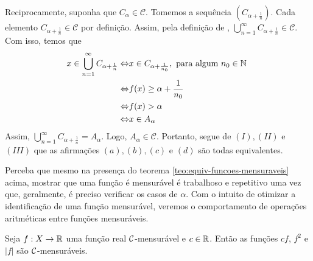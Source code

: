 \begin{prova}
Reciprocamente, suponha que $C_\alpha \in \mathcal{C}$. Tomemos a sequência $\left(C_{\alpha + \frac{1}{n}}\right)$.
Cada elemento $C_{\alpha +\frac{1}{n}} \in \mathcal{C}$ por definição.
Assim, pela definição de \sigal, 
$\displaystyle \bigcup_{n = 1}^\infty C_{\alpha +\frac{1}{n}} \in \mathcal{C}$. Com isso, temos que
\begin{align*}
    x \in \displaystyle \bigcup_{n = 1}^\infty C_{\alpha +\frac{1}{n}}
    \Leftrightarrow & x \in C_{\alpha + \frac{1}{n_0}}, \textrm{\ para algum  $n_0 \in \N$ }\\
    \Leftrightarrow & f(x)\geq \alpha +\dfrac{1}{n_0}\\
    \Leftrightarrow & f(x) > \alpha \\
    \Leftrightarrow & x \in A_\alpha
\end{align*}
Assim, $\displaystyle \bigcup_{n = 1}^\infty C_{\alpha +\frac{1}{n}} = A_\alpha$. Logo, $A_\alpha \in \mathcal{C}$.
Portanto, segue de $(I), (II)$ e $(III)$ que as afirmações $(a), (b), (c)$ e $(d)$ são todas equivalentes.


\end{prova}

Perceba que mesmo na presença do teorema \ref{teo:equiv-funcoes-mensuraveis} acima, mostrar que uma função é mensurável é trabalhoso e repetitivo uma vez que, geralmente, é preciso verificar os casos de $\alpha$.
Com o intuito de otimizar a identificação de uma função mensurável, veremos o comportamento de operações aritméticas entre funções mensuráveis.


\begin{proposition}
\label{prop:aritmetica-uma-funcao}
Seja $f: X \to \mathbb{R}$ uma função real $\operatorname{\mathcal{C}}$-mensurável e $c \in \mathbb{R}$. Então as funções $cf$, $f^2$ e $|f|$ são $\operatorname{\mathcal{C}}$-mensuráveis. 
\end{proposition}

